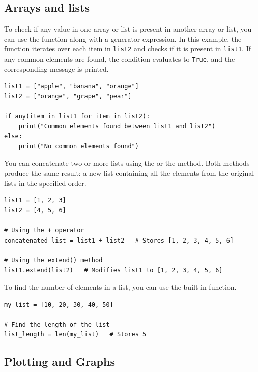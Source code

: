 \subsection{Arrays and lists}

To check if any value in one array or list is present in another array or list, you can use the  function along with a generator expression. In this example, the  function iterates over each item in \texttt{list2} and checks if it is present in \texttt{list1}. If any common elements are found, the condition evaluates to \texttt{True}, and the corresponding message is printed.
\begin{lstlisting}
list1 = ["apple", "banana", "orange"]
list2 = ["orange", "grape", "pear"]

if any(item in list1 for item in list2):
    print("Common elements found between list1 and list2")
else:
    print("No common elements found")
\end{lstlisting}
 
You can concatenate two or more lists using the  or the  method. Both methods produce the same result: a new list containing all the elements from the original lists in the specified order.
\begin{lstlisting}
list1 = [1, 2, 3]
list2 = [4, 5, 6]

# Using the + operator
concatenated_list = list1 + list2   # Stores [1, 2, 3, 4, 5, 6]

# Using the extend() method
list1.extend(list2)   # Modifies list1 to [1, 2, 3, 4, 5, 6]
\end{lstlisting}

To find the number of elements in a list, you can use the built-in  function.
\begin{lstlisting}
my_list = [10, 20, 30, 40, 50]

# Find the length of the list
list_length = len(my_list)   # Stores 5
\end{lstlisting}








\subsection{Plotting and Graphs}

